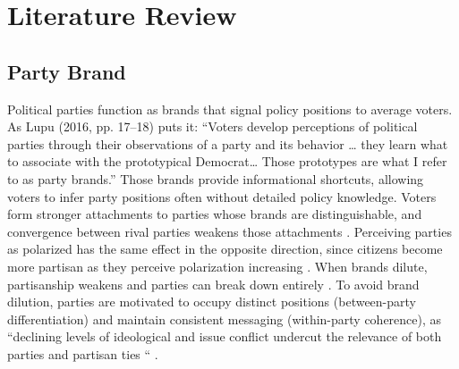 \section{Literature Review}


\subsection{Party Brand}

Political parties function as brands that signal policy positions to average voters. As Lupu (2016, pp. 17--18) puts it: ``Voters develop perceptions of political parties through their observations of a party and its behavior \ldots{} they learn what to associate with the prototypical Democrat\ldots{} Those prototypes are what I refer to as party brands.'' Those brands provide informational shortcuts, allowing voters to infer party positions often without detailed policy knowledge. Voters form stronger attachments to parties whose brands are distinguishable, and convergence between rival parties weakens those attachments \citep{lupuPartyBrandsPartisanship2013}. Perceiving parties as polarized has the same effect in the opposite direction, since citizens become more partisan as they perceive polarization increasing \citep{lupuPartyPolarizationMass2015}. When brands dilute, partisanship weakens and parties can break down entirely \citep{lupuPartyBrandsCrisis2016}. To avoid brand dilution, parties are motivated to occupy distinct positions (between-party differentiation) and maintain consistent messaging (within-party coherence), as ``declining levels of ideological and issue conflict undercut the relevance of both parties and partisan ties `` \citep[p. 110]{schmittPoliticalPartiesDecline1998}.

